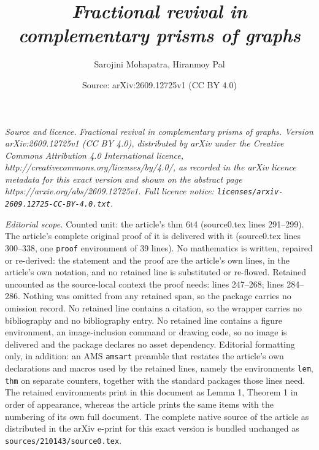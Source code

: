 \documentclass[10pt,a4paper]{amsart}
\title{\it Fractional revival in complementary prisms of graphs}
\author{Sarojini Mohapatra, Hiranmoy Pal}
\date{Source: arXiv:2609.12725v1 (CC BY 4.0)}
\begin{document}
\maketitle

\noindent\emph{Source and licence.} \it Fractional revival in complementary prisms of graphs. Version arXiv:2609.12725v1 (CC BY 4.0), distributed by arXiv under the Creative Commons Attribution 4.0 International licence, http://creativecommons.org/licenses/by/4.0/, as recorded in the arXiv licence metadata for this exact version and shown on the abstract page https://arxiv.org/abs/2609.12725v1. Full licence notice: \texttt{licenses/arxiv-2609.12725-CC-BY-4.0.txt}.\par\smallskip

\noindent\textit{Editorial scope.} Counted unit: the article's thm 6t4 (source0.tex lines 291--299). The article's complete original proof of it is delivered with it (source0.tex lines 300--338, one \texttt{proof} environment of 39 lines). No mathematics is written, repaired or re-derived: the statement and the proof are the article's own lines, in the article's own notation, and no retained line is substituted or re-flowed.  Retained uncounted as the source-local context the proof needs: lines 247--268; lines 284--286.  Nothing was omitted from any retained span, so the package carries no omission record.  No retained line contains a citation, so the wrapper carries no bibliography and no bibliography entry.  No retained line contains a figure environment, an image-inclusion command or drawing code, so no image is delivered and the package declares no asset dependency.  Editorial formatting only, in addition: an AMS \texttt{amsart} preamble that restates the article's own declarations and macros used by the retained lines, namely the environments \texttt{lem}, \texttt{thm} on separate counters, together with the standard packages those lines need.  The retained environments print in this document as Lemma 1, Theorem 1 in order of appearance, whereas the article prints the same items with the numbering of its own full document.  The complete native source of the article as distributed in the arXiv e-print for this exact version is bundled unchanged as \texttt{sources/210143/source0.tex}.
\end{document}
